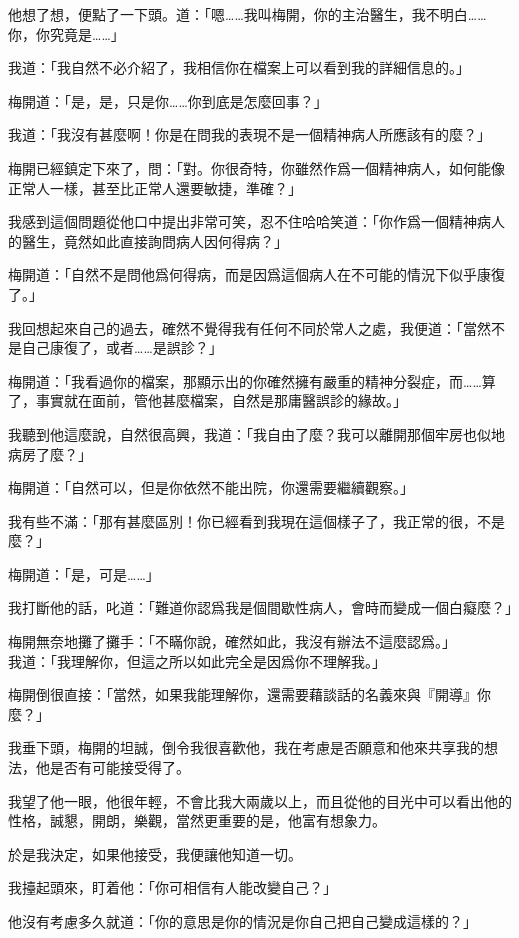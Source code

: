 他想了想，便點了一下頭。道：「嗯……我叫梅開，你的主治醫生，我不明白……你，你究竟是……」

我道：「我自然不必介紹了，我相信你在檔案上可以看到我的詳細信息的。」

梅開道：「是，是，只是你……你到底是怎麼回事？」

我道：「我沒有甚麼啊！你是在問我的表現不是一個精神病人所應該有的麼？」

梅開已經鎮定下來了，問：「對。你很奇特，你雖然作爲一個精神病人，如何能像正常人一樣，甚至比正常人還要敏捷，準確？」

我感到這個問題從他口中提出非常可笑，忍不住哈哈笑道：「你作爲一個精神病人的醫生，竟然如此直接詢問病人因何得病？」

梅開道：「自然不是問他爲何得病，而是因爲這個病人在不可能的情況下似乎康復了。」

我回想起來自己的過去，確然不覺得我有任何不同於常人之處，我便道：「當然不是自己康復了，或者……是誤診？」

梅開道：「我看過你的檔案，那顯示出的你確然擁有嚴重的精神分裂症，而……算了，事實就在面前，管他甚麼檔案，自然是那庸醫誤診的緣故。」

我聽到他這麼說，自然很高興，我道：「我自由了麼？我可以離開那個牢房也似地病房了麼？」

梅開道：「自然可以，但是你依然不能出院，你還需要繼續觀察。」

我有些不滿：「那有甚麼區別！你已經看到我現在這個樣子了，我正常的很，不是麼？」

梅開道：「是，可是……」

我打斷他的話，叱道：「難道你認爲我是個間歇性病人，會時而變成一個白癡麼？」

梅開無奈地攤了攤手：「不瞞你說，確然如此，我沒有辦法不這麼認爲。」
\\


我道：「我理解你，但這之所以如此完全是因爲你不理解我。」

梅開倒很直接：「當然，如果我能理解你，還需要藉談話的名義來與『開導』你麼？」

我垂下頭，梅開的坦誠，倒令我很喜歡他，我在考慮是否願意和他來共享我的想法，他是否有可能接受得了。

我望了他一眼，他很年輕，不會比我大兩歲以上，而且從他的目光中可以看出他的性格，誠懇，開朗，樂觀，當然更重要的是，他富有想象力。

於是我決定，如果他接受，我便讓他知道一切。

我擡起頭來，盯着他：「你可相信有人能改變自己？」

他沒有考慮多久就道：「你的意思是你的情況是你自己把自己變成這樣的？」


